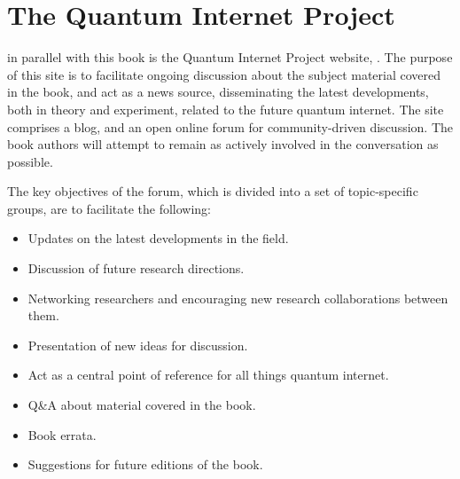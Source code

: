 %
%

\section{The Quantum Internet Project}

 in parallel with this book is the Quantum Internet Project website, \QIhomepage. The purpose of this site is to facilitate ongoing discussion about the subject material covered in the book, and act as a news source, disseminating the latest developments, both in theory and experiment, related to the future quantum internet. The site comprises a blog, and an open online forum for community-driven discussion. The book authors will attempt to remain as actively involved in the conversation as possible.

The key objectives of the forum, which is divided into a set of topic-specific groups, are to facilitate the following:
\begin{itemize}
\item Updates on the latest developments in the field.
\item Discussion of future research directions.
\item Networking researchers and encouraging new research collaborations between them.
\item Presentation of new ideas for discussion.
\item Act as a central point of reference for all things quantum internet.
\item Q\&A about material covered in the book.
\item Book errata.
\item Suggestions for future editions of the book.
\end{itemize}

